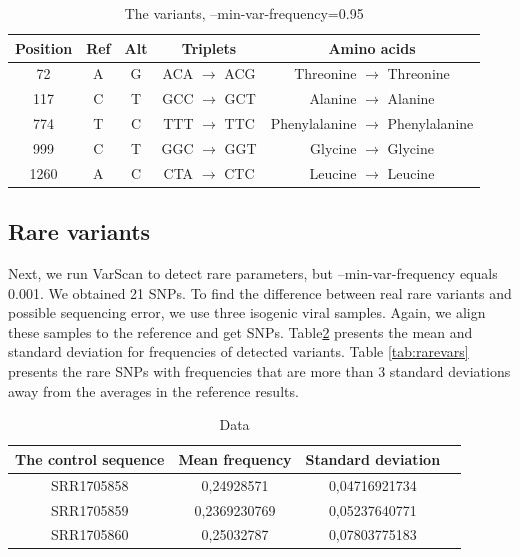 \documentclass{article}
\begin{document}
\begin{table}
	\centering
	\begin{tabular}{|c|c|c|c|c|}
		\hline
		Position & Ref  & Alt & Triplets & Amino acids\\
		\hline
		72 & A & G & ACA $\rightarrow$ ACG & Threonine $\rightarrow$  Threonine \\
		\hline
		117  & C & T & GCC  $\rightarrow$  GCT & Alanine $\rightarrow$  Alanine\\
		\hline
		774  & T & C & TTT $\rightarrow$   TTC & Phenylalanine $\rightarrow$  Phenylalanine\\
		\hline
		999  & C & T & GGC  $\rightarrow$  GGT & Glycine $\rightarrow$  Glycine \\
		\hline
		1260 & A & C & CTA  $\rightarrow$  CTC & Leucine $\rightarrow$  Leucine \\
		\hline
	\end{tabular}
	\caption{ The variants, --min-var-frequency=0.95 }
	\label{tab:vars}
\end{table}


\subsection{Rare variants}
 Next, we run VarScan to detect rare parameters, but --min-var-frequency equals 0.001. We obtained 21 SNPs. To find the difference between real rare variants and possible sequencing error, we use three isogenic viral samples. Again, we align these samples to the reference and get SNPs.  Table\ref{tab:freqs} presents the mean and standard deviation for frequencies of detected variants. Table \ref{tab:rarevars} presents the rare SNPs with frequencies that are more than 3 standard deviations away from the averages in the reference results. 
 



\begin{table} 
	\centering
	\begin{tabular}{|c|c|c|c|}
		\hline
		The control sequence & Mean frequency & Standard deviation  \\
		\hline
		SRR1705858 & 0,24928571 & 0,04716921734 \\
		\hline
		SRR1705859 & 0,2369230769 & 0,05237640771 \\
		\hline
		SRR1705860 & 0,25032787 & 0,07803775183 \\
		\hline
	\end{tabular}
	\caption{Data}
	\label{tab:freqs}
\end{table}
\end{document}
